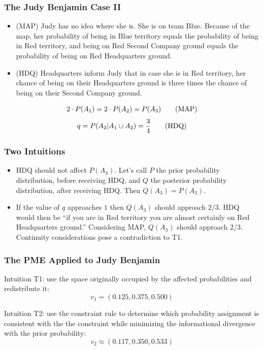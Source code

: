 \documentclass[xcolor=dvipsnames]{beamer}
\begin{document}
\begin{frame}
  \frametitle{The Judy Benjamin Case II}
\begin{itemize}
\item (MAP) Judy has no idea where she is. She is on team Blue.
  Because of the map, her probability of being in Blue territory
  equals the probability of being in Red territory, and being on Red
  Second Company ground equals the probability of being on Red
  Headquarters ground.
\item (HDQ) Headquarters inform Judy that in case she is in Red
  territory, her chance of being on their Headquarters ground is three
  times the chance of being on their Second Company ground.
\end{itemize}
\begin{equation}
  \label{eq:map}
  2\cdot{}P(A_{1})=2\cdot{}P(A_{2})=P(A_{3})\tag{\mbox{MAP}}
\end{equation}
\begin{equation}
  \label{eq:hdq}
  q=P(A_{2}|A_{1}\cup{}A_{2})=\frac{3}{4}\tag{\mbox{HDQ}}
\end{equation}
\end{frame}

\begin{frame}
  \frametitle{Two Intuitions}
  \begin{itemize}
  \item<1->[\color{blue}{(T1)}] HDQ should not affect $P(A_{3})$. Let's
    call $P$ the prior probability distribution, before receiving HDQ,
    and $Q$ the posterior probability distribution, after receiving
    HDQ. Then $Q(A_{3})=P(A_{3})$.
  \item<2->[\color{blue}{(T2)}] If the value of $q$ approaches $1$
  then $Q(A_{3})$ should approach $2/3$. HDQ would then be ``if you
  are in Red territory you are almost certainly on Red Headquarters
  ground.'' Considering MAP, $Q(A_{3})$ should approach $2/3$.
  Continuity considerations pose a contradiction to T1.
  \end{itemize}
\end{frame}

\begin{frame}
  \frametitle{The PME Applied to Judy Benjamin}
Intuition T1: use the space originally occupied by the affected
probabilities and redistribute it:
  \begin{displaymath}
    v_{1}=(0.125,0.375,0.500)
  \end{displaymath}

Intuition T2: use the constraint rule to determine which
probability assignment is consistent with the the constraint
while minimizing the informational divergence with the prior
probability:
  \begin{displaymath}
    v_{2}\approx{}(0.117,0.350,0.533)
  \end{displaymath}
\end{frame}
\end{document}
